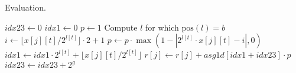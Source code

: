 % 

\begin{algorithm}[tbp]
\small{
	\caption{Evaluation.}
	\label{alg:evaluation}
	\begin{algorithmic}[1]
    		\State $\textit{idx23} \leftarrow 0$
						\State $\textit{idx1} \leftarrow 0$
						\State $\textit{p} \leftarrow 1$
							\State Compute $l$ for which $\text{pos}(l) = b$
						\EndIf
							\State $i \leftarrow \lfloor x[j][t] / 2^{l[t]} \rfloor \cdot 2 + 1$
							\State $p \leftarrow p \cdot \max(1 - |2^{l[t]} \cdot x[j][t] - i|, 0)$
							\State $\textit{idx1} \leftarrow \textit{idx1} \cdot 2^{l[t]} + \lfloor	x[j][t] / 2^{l[t]} \rfloor$
						\EndFor
						\State $r[j] \leftarrow r[j] + \textit{asg1d}[\textit{idx1}	+\textit{idx23}] \cdot p$ 
						\State $\textit{idx23} \leftarrow \textit{idx23} + 2^g$
					\EndFor
				\EndFor
    		\EndFor
    	\EndProcedure
 	\end{algorithmic}
}
\end{algorithm}

